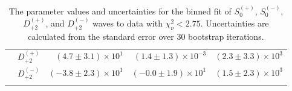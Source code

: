 \begin{center}
\begin{longtable}{clrrr}
         & $D_{+2}^{(+)}$ & $(4.7 \pm 3.1) \times 10^{1}$ & $(1.4 \pm 1.3) \times 10^{-3}$ & $(2.3 \pm 3.3) \times 10^{3}$ \\*
         & $D_{+2}^{(-)}$ & $(-3.8 \pm 2.3) \times 10^{1}$ & $(-0.0 \pm 1.9) \times 10^{1}$ & $(1.5 \pm 2.3) \times 10^{3}$ \\*\bottomrule
    \caption{The parameter values and uncertainties for the binned fit of $S_{0}^{(+)}$, $S_{0}^{(-)}$, $D_{+2}^{(+)}$, and $D_{+2}^{(-)}$ waves to data with $\chi^2_\nu < 2.75$. Uncertainties are calculated from the standard error over $30$ bootstrap iterations.}\label{tab:binned-fit-chisqdof-2.75-Sp0p-Sp0m-Dp2p-Dp2m}
    \end{longtable}
\end{center}

